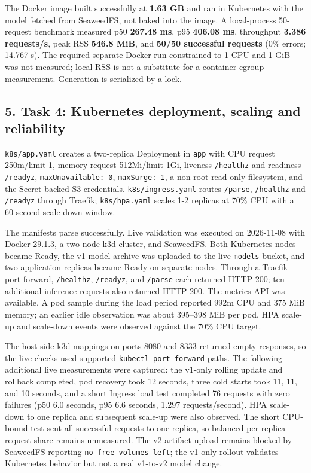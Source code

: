 \documentclass[
]{article}
\begin{document}
The Docker image built successfully at \textbf{1.63 GB} and ran in
Kubernetes with the model fetched from SeaweedFS, not baked into the
image. A local-process 50-request benchmark measured p50 \textbf{267.48
ms}, p95 \textbf{406.08 ms}, throughput \textbf{3.386 requests/s}, peak
RSS \textbf{546.8 MiB}, and \textbf{50/50 successful requests} (0\%
errors; 14.767 s). The required separate Docker run constrained to 1 CPU
and 1 GiB was not measured; local RSS is not a substitute for a
container cgroup measurement. Generation is serialized by a lock.

\hypertarget{task-4-kubernetes-deployment-scaling-and-reliability}{%
\subsection{5. Task 4: Kubernetes deployment, scaling and
reliability}\label{task-4-kubernetes-deployment-scaling-and-reliability}}

\texttt{k8s/app.yaml} creates a two-replica Deployment in \texttt{app}
with CPU request 250m/limit 1, memory request 512Mi/limit 1Gi, liveness
\texttt{/healthz} and readiness \texttt{/readyz},
\texttt{maxUnavailable:\ 0}, \texttt{maxSurge:\ 1}, a non-root read-only
filesystem, and the Secret-backed S3 credentials.
\texttt{k8s/ingress.yaml} routes \texttt{/parse}, \texttt{/healthz} and
\texttt{/readyz} through Traefik; \texttt{k8s/hpa.yaml} scales 1-2
replicas at 70\% CPU with a 60-second scale-down window.

The manifests parse successfully. Live validation was executed on
2026-11-08 with Docker 29.1.3, a two-node k3d cluster, and SeaweedFS.
Both Kubernetes nodes became Ready, the v1 model archive was uploaded to
the live \texttt{models} bucket, and two application replicas became
Ready on separate nodes. Through a Traefik port-forward,
\texttt{/healthz}, \texttt{/readyz}, and \texttt{/parse} each returned
HTTP 200; ten additional inference requests also returned HTTP 200. The
metrics API was available. A pod sample during the load period reported
992m CPU and 375 MiB memory; an earlier idle observation was about
395--398 MiB per pod. HPA scale-up and scale-down events were observed
against the 70\% CPU target.

The host-side k3d mappings on ports 8080 and 8333 returned empty
responses, so the live checks used supported
\texttt{kubectl\ port-forward} paths. The following additional live
measurements were captured: the v1-only rolling update and rollback
completed, pod recovery took 12 seconds, three cold starts took 11, 11,
and 10 seconds, and a short Ingress load test completed 76 requests with
zero failures (p50 6.0 seconds, p95 6.6 seconds, 1.297 requests/second).
HPA scale-down to one replica and subsequent scale-up were also
observed. The short CPU-bound test sent all successful requests to one
replica, so balanced per-replica request share remains unmeasured. The
v2 artifact upload remains blocked by SeaweedFS reporting
\texttt{no\ free\ volumes\ left}; the v1-only rollout validates
Kubernetes behavior but not a real v1-to-v2 model change.
\end{document}
